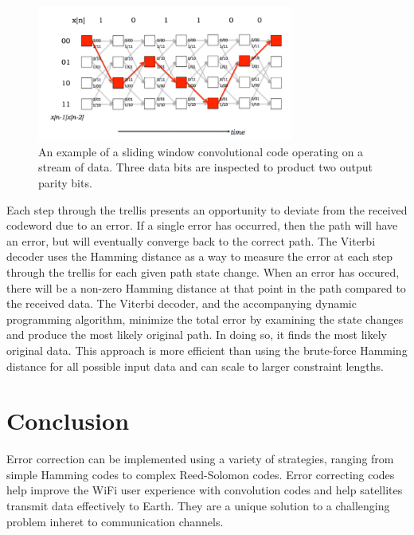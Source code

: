 \documentclass[12pt]{article}
\begin{document}
\begin{figure}[ht!]
 \centering
 \includegraphics[width=0.75\textwidth]{img/trellis.png}
 \caption{An example of a sliding window convolutional code operating on a stream of data. Three data bits are inspected to product two output parity bits. \cite{mitconv} }
 \label{fig:trellis}
 \end{figure}

Each step through the trellis presents an opportunity to deviate from the received codeword due to an error. If a single error has occurred, then the path will have an error, but will eventually converge back to the correct path. The Viterbi decoder uses the Hamming distance as a way to measure the error at each step through the trellis for each given path state change. When an error has occured, there will be a non-zero Hamming distance at that point in the path compared to the received data. The Viterbi decoder, and the accompanying dynamic programming algorithm, minimize the total error by examining the state changes and produce the most likely original path. In doing so, it finds the most likely original data. This approach is more efficient than using the brute-force Hamming distance for all possible input data and can scale to larger constraint lengths. \cite{mitvit}

\section{Conclusion}

Error correction can be implemented using a variety of strategies, ranging from simple Hamming codes to complex Reed-Solomon codes. Error correcting codes help improve the WiFi user experience with convolution codes and help satellites transmit data effectively to Earth. They are a unique solution to a challenging problem inheret to communication channels.
\end{document}
